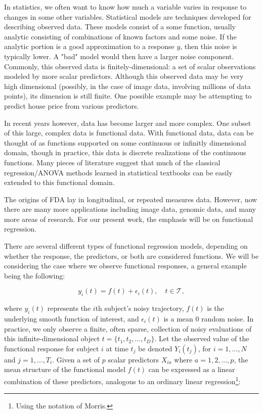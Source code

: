 In statistics, we often want to know how much a variable varies in response to changes in some other variables. 
Statistical models are techniques developed for describing observed data.  
These models consist of a some function, usually analytic consisting of combinations of known factors and some noise.  
If the analytic portion is a good approximation to a response \(y\), then this noise is typically lower.  
A "bad" model would then have a larger noise component.  
Commonly, this observed data is finitely-dimensional: a set of scalar observations modeled by more scalar predictors.  
Although this observed data may be very high dimensional (possibly, in the case of image data, involving millions of data points), its dimension is still finite.  
One possible example may be attempting to predict house price from various predictors\cite{de_cock_ames_2011}.

In recent years however, data has become larger and more complex.  
One subset of this large, complex data is functional data.  
With functional data, data can be thought of as functions supported on some continuous or infinitly dimensional domain, though in practice, this data is discrete realizations of the continuous functions.   
Many pieces of literature suggest that much of the classical regression/ANOVA methods learned in statistical textbooks can be easily extended to this functional domain.

The origins of FDA lay in longitudinal, or repeated measures data.  
However, now there are many more applications including image data, genomic data, and many more areas of research\cite{morris_functional_2015}.  
For our present work, the emphasis will be on functional regression.  

There are several different types of functional regression models, depending on whether the response, the predictors, or both are considered functions.  
We will be considering the case where we observe functional responses, a general example being the following: 

\begin{equation}
    y_i(t) = f(t) + \epsilon_i(t), \quad t \in \mathcal{T},
\end{equation}

\noindent
where $y_i(t)$ represents the $i$th subject’s noisy trajectory, $f(t)$ is the underlying smooth function of interest, and \(\epsilon_i(t)\) is a mean 0 random noise. 
In practice, we only observe a finite, often sparse, collection of noisy evaluations of this infinite-dimensional object \(t=\{t_1,t_2,\dots,t_D\}\).  
Let the observed value of the functional response for subject \(i\) at time \(t_j\) be denoted \(Y_i(t_j)\), for \(i = 1, \dots, N\) and \(j = 1, \dots, T_i\).  
Given a set of \(p\) scalar predictors \(X_{ia}\) where \( a = 1,2,\dots, p\), the mean structure of the functional model \(f(t)\) can be expressed as a linear combination of these predictors, analogous to an ordinary linear regression\footnote{Using the notation of Morris\cite{morris_functional_2015}.}:

